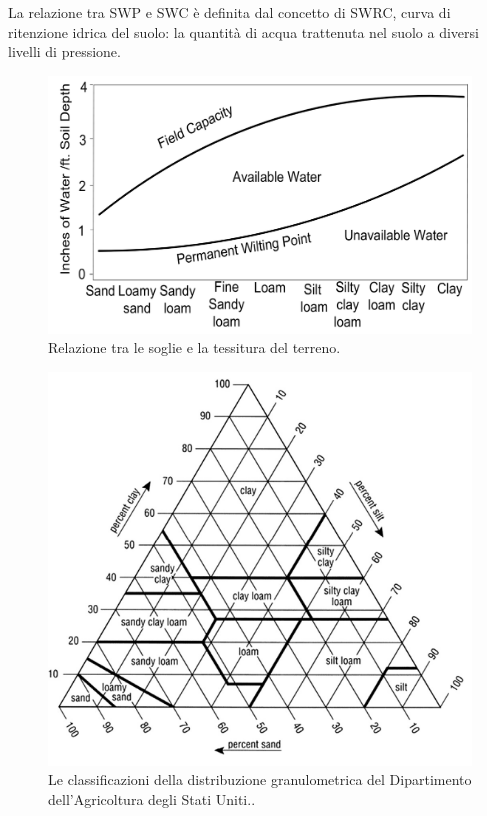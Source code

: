 \documentclass[12pt,a4paper,openright,twoside]{book}
\begin{document}
La relazione tra \ac{SWP} e \ac{SWC} è definita dal concetto di \ac{SWRC}, curva di ritenzione idrica del suolo: la quantità di acqua trattenuta nel suolo a diversi livelli di pressione\cite{assouline1998water}.
\begin{figure}
    \centering
    \includegraphics[width=0.5\linewidth]{../figures/SWC-costants-in-different-soils.png}
    \caption{Relazione tra le soglie e la tessitura del terreno\cite{Ding2022}.}
    \label{fig.SWC-costants-in-different-soils}
\end{figure}
\begin{figure}
    \centering
    \includegraphics[width=0.8\linewidth]{../figures/soil-texture.png}
    \caption{Le classificazioni della distribuzione granulometrica del Dipartimento dell'Agricoltura degli Stati Uniti.\cite{RAI2017505}.}
    \label{fig.soil-texture}
\end{figure}
\end{document}

